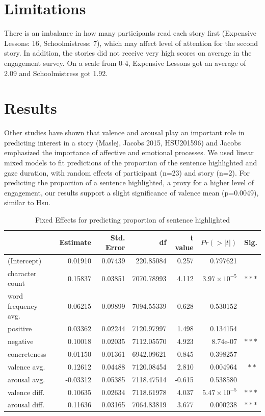 \documentclass[11pt]{article}
\begin{document}
\section{Limitations}

There is an imbalance in how many participants read each story first (Expensive Lessons: 16, Schoolmistress: 7), which may affect level of attention for the second story. In addition, the stories did not receive very high scores on average in the engagement survey. On a scale from 0-4, Expensive Lessons got an average of 2.09 and Schoolmistress got 1.92.

\section{Results}

Other studies have shown that valence and arousal play an important role in predicting interest in a story (Maslej, Jacobs 2015, HSU201596) and Jacobs emphasized the importance of affective and emotional processes. We used linear mixed models to fit predictions of the proportion of the sentence highlighted and gaze duration, with random effects of participant (n=23) and story (n=2). For predicting the proportion of a sentence highlighted, a proxy for a higher level of engagement, our results support a slight significance of valence mean (p=0.0049), similar to Hsu.

\begin{table}[t]
  \centering
  \begin{tabular}{|l|r|r|r|r|r|r|}
  \hline
   & Estimate & Std. Error & df & t value & $Pr(>|t|)$ & Sig. \\
  \hline
  (Intercept) & 0.01910 & 0.07439 & 220.85084 & 0.257 & 0.797621 & \\
  character count & 0.15837 & 0.03851 & 7070.78993 & 4.112 & $3.97 \times 10^{-5}$ & $\ast\ast\ast$ \\
  word frequency avg. & 0.06215 & 0.09899 & 7094.55339 & 0.628 & 0.530152 & \\
  positive & 0.03362 & 0.02244 & 7120.97997 & 1.498 & 0.134154 & \\
  negative & 0.10018 & 0.02035 & 7112.05570 & 4.923 & 8.74e-07 & $\ast\ast\ast$ \\
  concreteness & 0.01150 & 0.01361 & 6942.09621 & 0.845 & 0.398257 & \\
  valence avg. & 0.12612 & 0.04488 & 7120.08454 & 2.810 & 0.004964 & $\ast\ast$ \\
  arousal avg. & -0.03312 & 0.05385 & 7118.47514 & -0.615 & 0.538580 & \\
  valence diff. & 0.10635 & 0.02634 & 7118.61978 & 4.037 & $5.47 \times 10^{-5}$ & $\ast\ast\ast$ \\
  arousal diff. & 0.11636 & 0.03165 & 7064.83819 & 3.677 & 0.000238 & $\ast\ast\ast$ \\
  \hline
\end{tabular}
\caption{Fixed Effects for predicting proportion of sentence highlighted}
\label{tab:accents}
\end{table}
\end{document}
